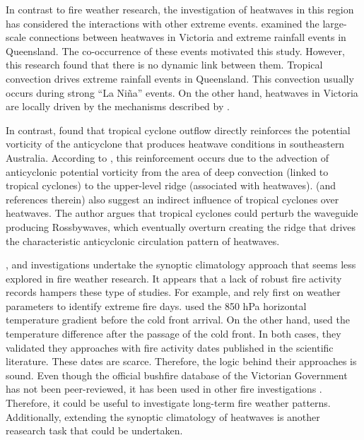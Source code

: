 In contrast to fire weather research, the investigation of heatwaves
in this region has considered the interactions with other extreme
events. \citet{Boschat2014} examined the large-scale connections
between heatwaves in Victoria and extreme rainfall events in Queensland.
The co-occurrence of these events motivated this study. However, this
research found that there is no dynamic link between them. Tropical
convection drives extreme rainfall events in Queensland. This convection
usually occurs during strong \textquotedblleft La Ni\~na\textquotedblright{}
events. On the other hand, heatwaves in Victoria are locally driven
by the mechanisms described by \citet{Pezza2012}. 

In contrast, \citet{Parker2013} found that tropical cyclone outflow directly reinforces the potential vorticity
of the anticyclone that produces heatwave conditions in southeastern Australia. According to \citet{Parker2013}, 
this reinforcement occurs due to the advection of anticyclonic potential vorticity from the area of 
deep convection (linked to tropical cyclones) to the upper-level ridge (associated with heatwaves).
\citet{Parker2013} (and references therein) also suggest an indirect influence of tropical cyclones over heatwaves. 
The author argues that tropical cyclones could perturb the waveguide producing Rossbywaves, 
which eventually overturn creating the ridge that drives the characteristic anticyclonic circulation pattern of heatwaves.   
            

\citet{Pezza2012}, \citet{Boschat2014} and \citet{Parker2014a}
investigations undertake the synoptic climatology approach that seems
less explored in fire weather research. It appears that a lack of
robust fire activity records hampers these type of studies. For example,
\citet{Mills2005} and \citet{Reeder2015} rely first on weather parameters
to identify extreme fire days. \citet{Mills2005} used the 850 hPa
horizontal temperature gradient before the cold front arrival. On
the other hand, \citet{Reeder2015} used the temperature difference
after the passage of the cold front. In both cases, they validated
they approaches with fire activity dates published in the scientific
literature. These dates are scarce. Therefore, the logic behind their
approaches is sound. Even though the official bushfire database of
the Victorian Government has not been peer-reviewed, it has been used
in other fire investigations \citep{Harris2013}. Therefore, it could
be useful to investigate long-term fire weather patterns. Additionally,
extending the synoptic climatology of heatwaves is another reasearch
task that could be undertaken.

